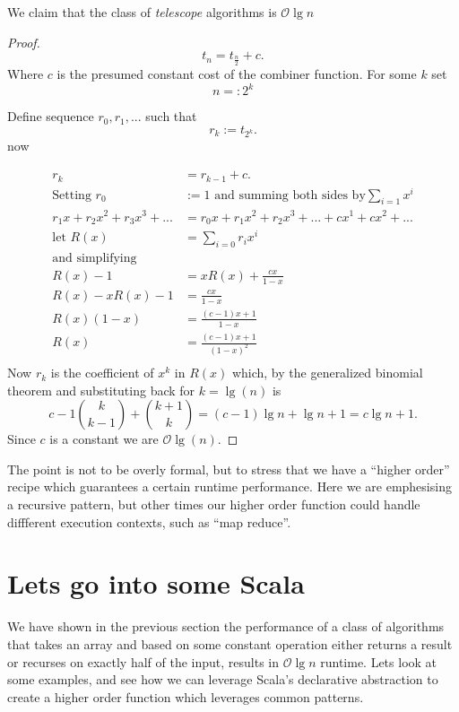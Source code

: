 \documentclass[12pt]{article}
\begin{document}
 We claim that the class of \textit{telescope} algorithms is $\mathcal{O}{\lg{n}}$
\begin{proof}
\[ t_n = t_{\frac{n}{2}} + c.\]
Where $c$ is the presumed constant cost of the combiner function. For some $k$ set
\[ n =: 2^{k} \]

Define sequence $r_{0}, r_{1} , ...$ such that
\[ r_{k} := t_{2^{k}}.\]
now

\begin{equation}
\begin{aligned}
 r_{k} &= r_{k-1} + c . \\
\text{Setting } r_{0} & := 1 \text{ and summing both sides by} \sum_{i = 1}x^{i} \\
r_{1}x + r_{2}x^{2} + r_{3}x^{3}+ ... & = r_{0}x + r_{1}x^{2} + r_{2}x^{3} +... + cx^{1} + cx^{2} + ... \\
\text{let } R(x) &= \sum_{i=0}r_{i}x^{i} \\ 
\text{and simplifying} \\
        R(x) - 1 &= xR(x) + \frac{cx}{1-x}   \\
 R(x) - xR(x)- 1 &= \frac{cx}{1-x} \\
       R(x)(1-x) &= \frac{(c-1)x+1}{1-x} \\
            R(x) &= \frac{(c-1)x+1}{(1-x)^{2}} \\
\end{aligned}
\end{equation}
Now $r_{k}$ is the coefficient of $x^{k}$ in $R(x)$ which, by the generalized binomial theorem and substituting back for $k = \lg(n)$ is
\[ c-1  \binom{k}{k-1} + \binom{k+1}{k} = (c -1)\lg{n} +\lg{n}+1 = c\lg{n} + 1. \]
Since $c$ is a constant we are $\mathcal{O}\lg(n)$.
\end{proof}

The point is not to be overly formal, but to stress that we have a ``higher order'' recipe which guarantees a certain runtime performance. Here we are emphesising a recursive pattern, but other times our higher order function could handle diffferent execution contexts, such as ``map reduce''.

\section{Lets go into some Scala}
We have shown in the previous section the performance of a class of algorithms that takes an array and based on some constant operation either returns a result or recurses on exactly half of the input, results in $\mathcal{O}\lg{n}$ runtime. Lets look at some examples, and see how we can leverage Scala's declarative abstraction to create a higher order function which leverages common patterns.
\end{document}
